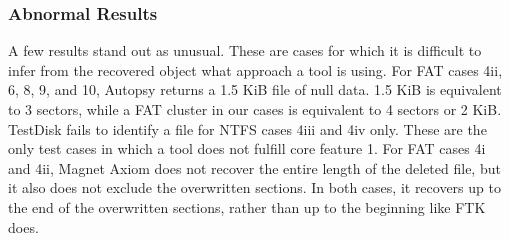 \subsubsection{Abnormal Results}
A few results stand out as unusual.
These are cases for which it is difficult to infer from the recovered object what approach a tool is using.
For FAT cases 4ii, 6, 8, 9, and 10, Autopsy returns a 1.5 KiB file of null data. 
1.5 KiB is equivalent to 3 sectors, while a FAT cluster in our cases is equivalent to 4 sectors or 2 KiB.
TestDisk fails to identify a file for NTFS cases 4iii and 4iv only. 
These are the only test cases in which a tool does not fulfill core feature 1.
For FAT cases 4i and 4ii, Magnet Axiom does not recover the entire length of the deleted file, but it also does not exclude the overwritten sections. 
In both cases, it recovers up to the end of the overwritten sections, rather than up to the beginning like FTK does.
